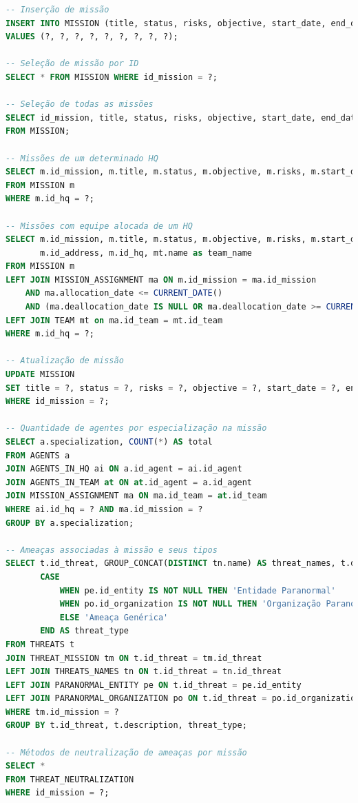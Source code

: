 \documentclass[12pt,a4paper]{report}
\begin{document}
\begin{lstlisting}[language=SQL, caption=Consultas feitas em MissionDAO]
-- Inserção de missão
INSERT INTO MISSION (title, status, risks, objective, start_date, end_date, id_address, id_hq, id_mission)
VALUES (?, ?, ?, ?, ?, ?, ?, ?, ?);

-- Seleção de missão por ID
SELECT * FROM MISSION WHERE id_mission = ?;

-- Seleção de todas as missões
SELECT id_mission, title, status, risks, objective, start_date, end_date, id_address, id_hq 
FROM MISSION;

-- Missões de um determinado HQ
SELECT m.id_mission, m.title, m.status, m.objective, m.risks, m.start_date, m.end_date, m.id_address, m.id_hq
FROM MISSION m
WHERE m.id_hq = ?;

-- Missões com equipe alocada de um HQ
SELECT m.id_mission, m.title, m.status, m.objective, m.risks, m.start_date, m.end_date,
       m.id_address, m.id_hq, mt.name as team_name
FROM MISSION m
LEFT JOIN MISSION_ASSIGNMENT ma ON m.id_mission = ma.id_mission
    AND ma.allocation_date <= CURRENT_DATE()
    AND (ma.deallocation_date IS NULL OR ma.deallocation_date >= CURRENT_DATE())
LEFT JOIN TEAM mt on ma.id_team = mt.id_team
WHERE m.id_hq = ?;

-- Atualização de missão
UPDATE MISSION 
SET title = ?, status = ?, risks = ?, objective = ?, start_date = ?, end_date = ?, id_address = ?, id_hq = ?
WHERE id_mission = ?;

-- Quantidade de agentes por especialização na missão
SELECT a.specialization, COUNT(*) AS total
FROM AGENTS a
JOIN AGENTS_IN_HQ ai ON a.id_agent = ai.id_agent
JOIN AGENTS_IN_TEAM at ON at.id_agent = a.id_agent
JOIN MISSION_ASSIGNMENT ma ON ma.id_team = at.id_team 
WHERE ai.id_hq = ? AND ma.id_mission = ?
GROUP BY a.specialization;

-- Ameaças associadas à missão e seus tipos
SELECT t.id_threat, GROUP_CONCAT(DISTINCT tn.name) AS threat_names, t.description,
       CASE 
           WHEN pe.id_entity IS NOT NULL THEN 'Entidade Paranormal'
           WHEN po.id_organization IS NOT NULL THEN 'Organização Paranormal'
           ELSE 'Ameaça Genérica'
       END AS threat_type
FROM THREATS t
JOIN THREAT_MISSION tm ON t.id_threat = tm.id_threat
LEFT JOIN THREATS_NAMES tn ON t.id_threat = tn.id_threat
LEFT JOIN PARANORMAL_ENTITY pe ON t.id_threat = pe.id_entity
LEFT JOIN PARANORMAL_ORGANIZATION po ON t.id_threat = po.id_organization
WHERE tm.id_mission = ?
GROUP BY t.id_threat, t.description, threat_type;

-- Métodos de neutralização de ameaças por missão
SELECT * 
FROM THREAT_NEUTRALIZATION
WHERE id_mission = ?;
\end{lstlisting}
\end{document}
